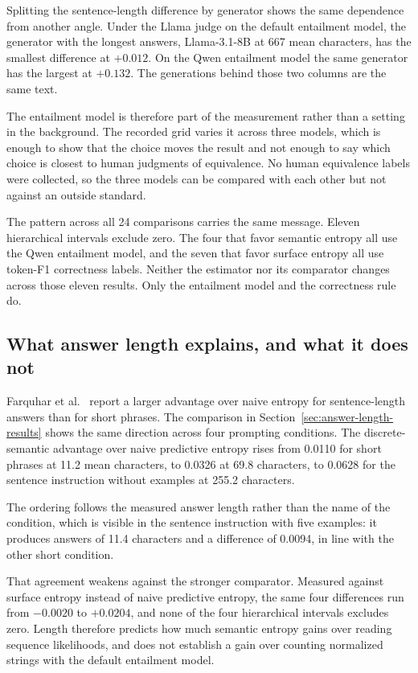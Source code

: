 Splitting the sentence-length
difference by generator shows the same dependence from another angle. Under the
Llama judge on the default entailment model, the generator with the longest
answers, Llama-3.1-8B at 667 mean characters, has the smallest difference at
$+0.012$. On the Qwen entailment model the same generator has the largest at
$+0.132$. The generations behind those two columns are the same text.

The entailment model is therefore part of the measurement rather than a setting
in the background. The recorded grid varies it across three models, which is
enough to show that the choice moves the result and not enough to say which
choice is closest to human judgments of equivalence. No human equivalence
labels were collected, so the three models can be compared with each other but
not against an outside standard.

The pattern across all 24 comparisons carries the same message. Eleven
hierarchical intervals exclude zero. The four that favor semantic entropy all
use the Qwen entailment model, and the seven that favor surface entropy all use
token-F1 correctness labels. Neither the estimator nor its comparator changes
across those eleven results. Only the entailment model and the correctness rule
do.

\subsection{What answer length explains, and what it does not}
\label{sec:length-discussion}

Farquhar et al.~\cite[Supplementary Note~7 and Supplementary Fig.~7]{semantic_entropy_nature_2024}
report a larger advantage over naive entropy for sentence-length answers than
for short phrases. The comparison in Section~\ref{sec:answer-length-results}
shows the same direction across four prompting conditions. The
discrete-semantic advantage over naive predictive entropy rises from 0.0110 for
short phrases at 11.2 mean characters, to 0.0326 at 69.8 characters, to 0.0628
for the sentence instruction without examples at 255.2 characters.

The ordering
follows the measured answer length rather than the name of the condition, which
is visible in the sentence instruction with five examples: it produces answers
of 11.4 characters and a difference of 0.0094, in line with the other short
condition.

That agreement weakens against the stronger comparator. Measured against
surface entropy instead of naive predictive entropy, the same four differences
run from $-0.0020$ to $+0.0204$, and none of the four hierarchical intervals
excludes zero. Length therefore predicts how much semantic entropy gains over
reading sequence likelihoods, and does not establish a gain over counting
normalized strings with the default entailment model.

